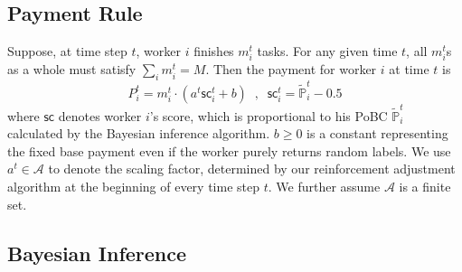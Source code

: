 \subsection{Payment Rule}
Suppose, at time step $t$, worker $i$ finishes $m^{t}_i$ tasks. For any given time $t$, all $m^{t}_i$s as a whole must satisfy $\sum_i m^t_i= M$. Then the payment for worker $i$ at time $t$ is
\begin{equation}
P^t_i=m^t_i\cdot (a^t \textsf{sc}^{t}_i+b)\;\; , \;\; \textsf{sc}^{t}_i = \tilde{\mathbb{P}}^{t}_i - 0.5
\label{equation:payment}
\end{equation}
where $\textsf{sc}$ denotes worker $i$'s score, which is proportional to his PoBC $\tilde{\mathbb{P}}^{t}_i$ calculated by the Bayesian inference algorithm. $b\geq 0$ is a constant representing the fixed base payment even if the worker purely returns random labels. We use $a^t \in \mathcal{A}$ to denote the scaling factor, determined by our reinforcement adjustment algorithm at the beginning of every time step $t$. We further assume $\mathcal{A}$ is a finite set.


\subsection{Bayesian Inference}


